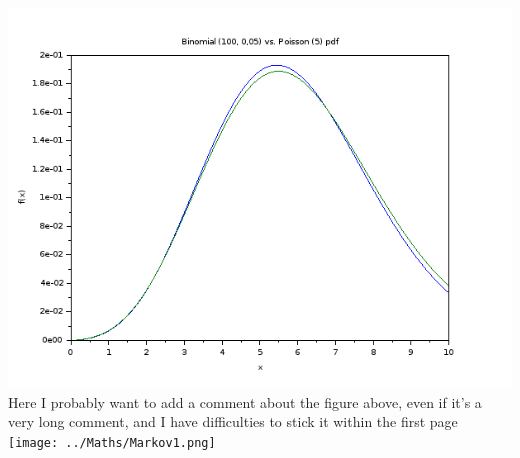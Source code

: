 \documentclass[11pt]{article} %
\begin{document}
\begin{multicols*}{2}
\includegraphics[scale=0.3]{../Maths/BinomialevsPoisson.png}
Here I probably want to add a comment about the figure above, even if it's a very long comment, and I have difficulties to stick it within the first page\\

\texttt{[image: ../Maths/Markov1.png]}

\end{multicols*}

\tiny{

}
\end{document}

